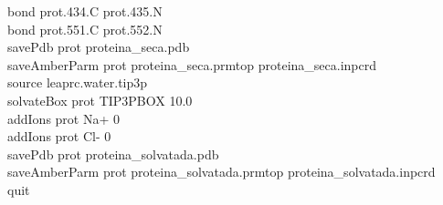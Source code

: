 \begin{adjustwidth}{1.0cm}{}
{                bond prot.434.C   prot.435.N\\
                bond prot.551.C   prot.552.N\\ 
                savePdb prot proteina\_seca.pdb\\
                saveAmberParm prot proteina\_seca.prmtop proteina\_seca.inpcrd\\
                source leaprc.water.tip3p\\
                solvateBox prot TIP3PBOX 10.0\\
                addIons prot Na+ 0 \\
                addIons prot Cl- 0\\
                savePdb prot proteina\_solvatada.pdb\\
                saveAmberParm prot proteina\_solvatada.prmtop proteina\_solvatada.inpcrd\\
                quit\\
            }\end{adjustwidth}
        
